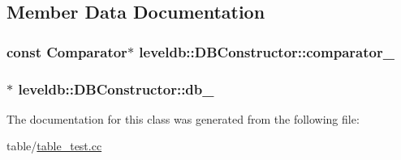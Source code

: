 \subsection{Member Data Documentation}
\hypertarget{classleveldb_1_1_d_b_constructor_ab16f3404f44a4e285b1728d613d4df06}{
\subsubsection[{comparator\-\_\-}]{\setlength{\rightskip}{0pt plus 5cm}const {\bf Comparator}$\ast$ leveldb\-::\-D\-B\-Constructor\-::comparator\-\_\-\hspace{0.3cm}{\ttfamily [private]}}}\label{classleveldb_1_1_d_b_constructor_ab16f3404f44a4e285b1728d613d4df06}
\hypertarget{classleveldb_1_1_d_b_constructor_ac2bca4fa55c2ba59ad2edc0ba2848e3a}{
\subsubsection[{db\-\_\-}]{$\ast$ leveldb\-::\-D\-B\-Constructor\-::db\-\_\-\hspace{0.3cm}{\ttfamily [private]}}}\label{classleveldb_1_1_d_b_constructor_ac2bca4fa55c2ba59ad2edc0ba2848e3a}


The documentation for this class was generated from the following file\-:\begin{DoxyCompactItemize}
\item 
table/\hyperlink{table__test_8cc}{table\-\_\-test.\-cc}\end{DoxyCompactItemize}
